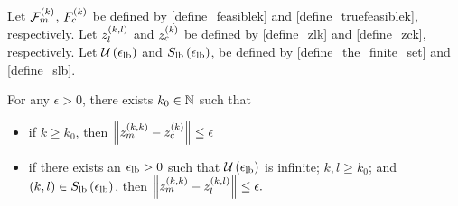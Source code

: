 \begin{theorem}
\label{bounded_projection_theorem}

Let ${\mathcal F_m^{(k)}}$, ${F_c^{(k)}}$ be defined by \cref{define_feasiblek} and \cref{define_truefeasiblek}, respectively.
Let ${z_l^{(k, l)}}$ and ${z_c^{(k)}}$ be defined by \cref{define_zlk} and \cref{define_zck}, respectively.
Let ${\mathcal U\left(\epsilon_{\textrm{lb}}\right)}$ and ${S_{\textrm{lb}}\left(\epsilon_{\textrm{lb}}\right)}$, be defined by \cref{define_the_finite_set} and \cref{define_slb}.




For any $\epsilon > 0$, there exists $k_0 \in \mathbb N$ such that
\begin{itemize}
\item if $k \ge k_0$, then
$
\left\|{z_m^{(k, k)}} - {z_c^{(k)}}\right\| \le \epsilon
$
\item if there exists an ${\epsilon_{\textrm{lb}}} > 0$ such that ${\mathcal U\left(\epsilon_{\textrm{lb}}\right)}$ is infinite; $k, l \ge k_0$; and $(k, l) \in {S_{\textrm{lb}}\left(\epsilon_{\textrm{lb}}\right)}$, then 
$
\left\|{z_m^{(k, k)}} - {z_l^{(k, l)}}\right\| \le \epsilon.
$
\end{itemize}
\end{theorem}
